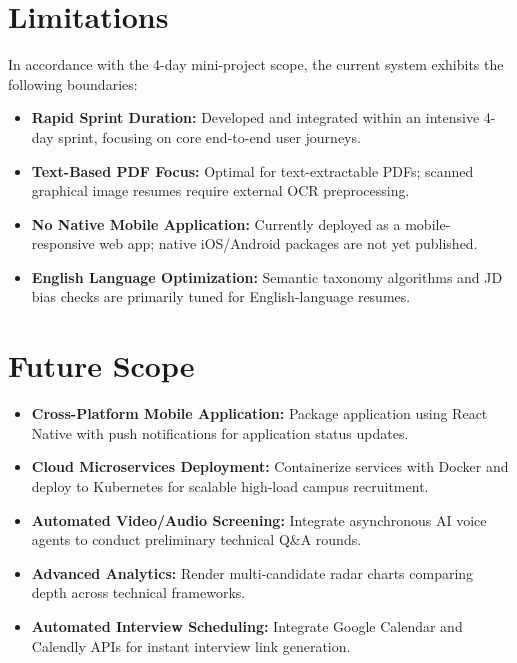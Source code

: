 \documentclass[12pt, a4paper]{article}
\begin{document}
\section{Limitations}
In accordance with the 4-day mini-project scope, the current system exhibits the following boundaries:
\begin{itemize}[leftmargin=1.5em, itemsep=2.5pt]
    \item \textbf{Rapid Sprint Duration:} Developed and integrated within an intensive 4-day sprint, focusing on core end-to-end user journeys.
    \item \textbf{Text-Based PDF Focus:} Optimal for text-extractable PDFs; scanned graphical image resumes require external OCR preprocessing.
    \item \textbf{No Native Mobile Application:} Currently deployed as a mobile-responsive web app; native iOS/Android packages are not yet published.
    \item \textbf{English Language Optimization:} Semantic taxonomy algorithms and JD bias checks are primarily tuned for English-language resumes.
\end{itemize}

\section{Future Scope}
\begin{itemize}[leftmargin=1.5em, itemsep=2.5pt]
    \item \textbf{Cross-Platform Mobile Application:} Package application using React Native with push notifications for application status updates.
    \item \textbf{Cloud Microservices Deployment:} Containerize services with Docker and deploy to Kubernetes for scalable high-load campus recruitment.
    \item \textbf{Automated Video/Audio Screening:} Integrate asynchronous AI voice agents to conduct preliminary technical Q\&A rounds.
    \item \textbf{Advanced Analytics:} Render multi-candidate radar charts comparing depth across technical frameworks.
    \item \textbf{Automated Interview Scheduling:} Integrate Google Calendar and Calendly APIs for instant interview link generation.
\end{itemize}

\end{document}
